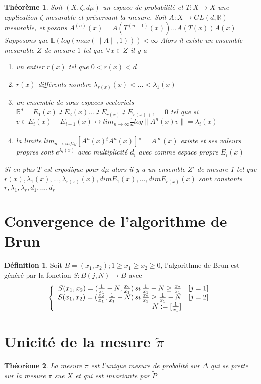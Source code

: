 \documentclass[12pt]{article}
\theoremstyle{plain}%
\newtheorem{thm}{Théorème}[section]
\theoremstyle{definition}
\newtheorem{dfnt}{Définition}[section]
\theoremstyle{remark}
\begin{document}
\begin{thm}
Soit $(X,\zeta,d\mu)$ un espace de probabilité et $T : X \to X$ une application $\zeta$-mesurable et préservant la mesure.
Soit $A:X \to GL(d,\mathbb{R})$ mesurable, et posons $A^(n)(x)=A(T^(n-1)(x))...A(T(x))A(x)$
Supposons que $\mathbb{E}(log(max(\|A\|,1)))<\infty$
Alors il existe un ensemble mesurable $Z$ de mesure $1$ tel que $\forall x \in Z$ il y a
\begin{enumerate}
      \item un entier $r(x)$ tel que $0<r(x)<d$
      \item $r(x)$ différents nombre $\lambda_{r(x)}(x)<...<\lambda_1(x)$
      \item un ensemble de sous-espaces vectoriels $\mathbb{R}^d = E_1(x) \supsetneqq E_2(x)... \supsetneqq E_{r(x)} \supsetneqq E_{r(x)+1}={0}$ tel que si $v \in E_i(x)-E_{i+1}(x) \leftrightarrow lim_{n \to \infty} \frac{1}{n} log \|A^n (x)v\|= \lambda_i (x)$
      \item la limite $lim_{n \to infty} [A^n(x) {}^t A^n(x)]^{\frac{1}{n}}=A^{\infty}(x)$ existe et ses valeurs propres sont $e^{\lambda_i(x)}$ avec multiplicité $d_i$ avec comme espace propre $E_i(x)$
\end{enumerate}
Si en plus $T$ est ergodique pour $d \mu$ alors il y a un ensemble $Z'$ de mesure 1 tel que $r(x),\lambda_1(x),...,\lambda_{r(x)}(x),dim E_1(x),..., dim E_{r(x)}(x)$ sont constants $r,\lambda_1,\lambda_r,d_1,...,d_r$
\end{thm}

\section{Convergence de l'algorithme de Brun}

\begin{dfnt}
Soit $B={(x_1,x_2); 1 \geq x_1 \geq x_2 \geq 0}$, l'algorithme de Brun est généré par la fonction $S:B(j,N) \to B$ avec
$$
\left \{
\begin{array}{r c }
S(x_1,x_2)=(\frac{1}{x_1}-N,\frac{x_2}{x_1}) \, si \, \frac{1}{x_1}-N \geq \frac{x_2}{x_1} & [j=1] \\
S(x_1,x_2)=(\frac{x_2}{x_1},\frac{1}{x_1}-N) \, si \, \frac{x_2}{x_1} \geq  \frac{1}{x_1}-N & [j=2] \\
N:=[\frac{1}{x_1}]
\end{array}
\right .
$$
\end{dfnt}

\section{Unicité de la mesure $\tilde{\pi}$}
\begin{thm}
La mesure $\tilde{\pi}$ est l'unique mesure de probalité sur $\Delta$ qui se prette sur la mesure $\pi$ sue $X$ et qui est invariante par $\tilde{P}$
\end{thm}
\end{document}
